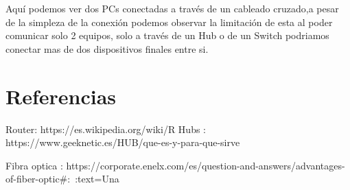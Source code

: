 \documentclass{article}
\begin{document}
Aquí podemos ver dos PCs conectadas a través de un cableado cruzado,a pesar de la simpleza de la conexión podemos observar la limitación de esta al poder comunicar solo 2 equipos, solo a través de un Hub o de un Switch podriamos conectar mas de dos dispositivos finales entre si.

\section{Referencias}
Router: https://es.wikipedia.org/wiki/R%
Hubs : https://www.geeknetic.es/HUB/que-es-y-para-que-sirve

Fibra optica : https://corporate.enelx.com/es/question-and-answers/advantages-of-fiber-optic#:~:text=Una%



\end{document}
